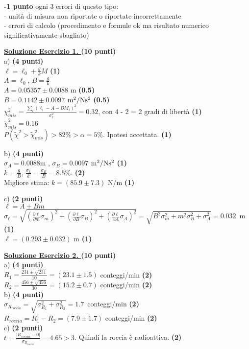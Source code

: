 \documentclass[10pt,a4paper,fleqn]{article}
\begin{document}
{\bf -1 punto} ogni 3 errori di questo tipo:\\
- unit\`a di misura non riportate o riportate incorrettamente \\
- errori di calcolo (procedimento e formule ok ma risultato numerico 
significativamente sbagliato)

\vskip0.30cm {\bf \underline {Soluzione Esercizio 1. } } {\bf (10 punti)}\\

a) {\bf (4 punti)}\\
   $\ell=\ell_0+\frac{g}{k}M$ {\bf (1)} \\ 
   $A=\ell_0$, $B=\frac{g}{k}$ \\ 
   $A=0.05357\pm 0.0088$ m {\bf (0.5)} \\
   $B=0.1142\pm 0.0097$ ${\rm m^2/Ns^2}$ {\bf (0.5)}\\ 
   $\chi^2_{mis}=\frac{\sum_i(\ell_i-A-BM_i)^2}{\sigma^2_{\ell}}=0.32$,
   con   4 - 2 = 2 gradi di libert\`a {\bf (1)}\\
   $\tilde\chi^2_{mis}=0.16$ \\
   $P(\tilde\chi^2>\tilde\chi^2_{mis})>82\%>\alpha=5\%$.
   Ipotesi accettata. {\bf (1)}

b) {\bf (4 punti)} \\ 
  $\sigma_A = 0.0088$m , $\sigma_B=0.0097$ ${\rm m^2/Ns^2}$ {\bf (1)}\\ 
  $k=\frac{g}{B}$, $\frac{\sigma_k}{k}=\frac{\sigma_B}{B}=8.5\%$. {\bf (2)}\\
   Migliore stima: $k=(85.9\pm 7.3)$ N/m {\bf (1)}   

c) {\bf (2 punti)} \\ 
$\ell = A + B m$\\
$\sigma_{\ell}=\sqrt{ (\frac{\partial \ell}{\partial m} \sigma_m)^2
+ (\frac{\partial \ell}{\partial B} \sigma_B)^2 + (\frac{\partial
  \ell}{\partial A}
\sigma_A)^2}=\sqrt{B^2\sigma_m^2+m^2\sigma^2_B+\sigma_A^2}=0.032$~m
{\bf (1)} \\
 $\ell=(0.293\pm 0.032)$ m {\bf (1)}

\vskip0.30cm {\bf \underline {Soluzione Esercizio 2. } } {\bf (10 punti)}\\

a) {\bf (4 punti)} \\
$R_1=\frac{231\pm\sqrt{231}}{10}=(23.1\pm 1.5)$ conteggi/min {\bf (2)}\\
$R_2=\frac{456\pm\sqrt{456}}{30}=(15.2\pm 0.7)$ conteggi/min {\bf (2)}\\
b) {\bf (4 punti)} \\
$\sigma_{R_{roccia}}=\sqrt{\sigma^2_{R_{1}}+\sigma^2_{R_{2}}}=1.7$~conteggi/min
{\bf (2)} \\
$R_{roccia}=R_1-R_2=(7.9\pm 1.7)$ conteggi/min {\bf (2)}\\
c) {\bf (2 punti)} \\
$t=\frac{|R_{roccia}-0|}{\sigma_{R_{roccia}}}=4.65>3$. Quindi la
roccia \`e radioattiva. {\bf (2)}
\end{document}

